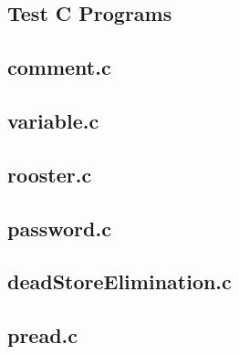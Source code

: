 
\onecolumn
\begin{appendices}
\section{Test C Programs}
\label{appendix:testPrograms}

\subsection{comment.c}


\subsection{variable.c}


\subsection{rooster.c}


\subsection{password.c}


\subsection{deadStoreElimination.c}


\subsection{pread.c}

\end{appendices}